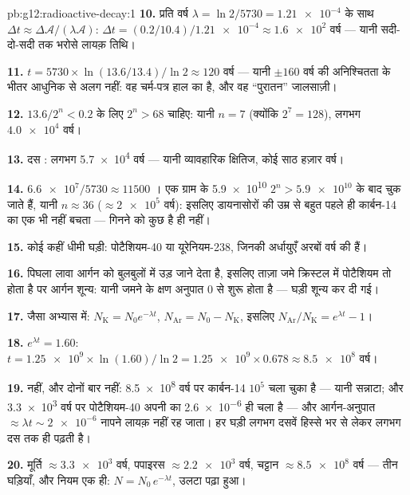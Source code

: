 \begin{solution}{pb:g12:radioactive-decay:1}
\textbf{10.} प्रति वर्ष $\lambda = \ln 2/5730 = \num{1.21e-4}$ के साथ $\Delta t \approx \Delta\mathcal A/(\lambda\mathcal A)$: $\Delta t = (0.2/10.4)/\num{1.21e-4} \approx \num{1.6e2}$ वर्ष --- यानी
सदी-दो-सदी तक भरोसे लायक़ तिथि।

\textbf{11.} $t = \num{5730} \times \ln(13.6/13.4)/\ln 2 \approx
120$ वर्ष --- यानी $\pm 160$ वर्ष की अनिश्चितता के भीतर आधुनिक
से अलग नहीं: वह चर्म-पत्र हाल का है, और वह ``पुरातन'' जालसाज़ी।

\textbf{12.} $13.6/2^n < 0.2$ के लिए $2^n > 68$ चाहिए: यानी $n = 7$  (क्योंकि
$2^7 = 128$), लगभग $\num{4.0e4}$ वर्ष।

\textbf{13.} दस : लगभग \num{5.7e4} वर्ष --- यानी व्यावहारिक क्षितिज, कोई
साठ हज़ार वर्ष।

\textbf{14.} $\num{6.6e7}/\num{5730} \approx \num{11500}$ । एक ग्राम के \num{5.9e10}  $2^n > \num{5.9e10}$ के
बाद चुक जाते हैं, यानी $n \approx 36$  ($\approx \num{2e5}$ वर्ष): इसलिए डायनासोरों की
उम्र से बहुत पहले ही कार्बन-14 का एक  भी नहीं बचता --- गिनने को
कुछ है ही नहीं।

\textbf{15.} कोई कहीं धीमी घड़ी: पोटैशियम-40 या यूरेनियम-238, जिनकी अर्धायुएँ
अरबों वर्ष की हैं।

\textbf{16.} पिघला लावा आर्गन को बुलबुलों में उड़ जाने देता है, इसलिए ताज़ा जमे
क्रिस्टल में पोटैशियम तो होता है पर आर्गन शून्य: यानी जमने के क्षण अनुपात
$0$ से शुरू होता है --- घड़ी शून्य कर दी गई।

\textbf{17.} जैसा अभ्यास में: $N_{\mathrm K} = N_0 e^{-\lambda t}$, $N_{\mathrm{Ar}} = N_0 - N_{\mathrm K}$, इसलिए $N_{\mathrm{Ar}}/N_{\mathrm K} = e^{\lambda t} - 1$।

\textbf{18.} $e^{\lambda t} = 1.60$: $t = \num{1.25e9} \times \ln(1.60)/\ln 2 = \num{1.25e9} \times 0.678
\approx \num{8.5e8}$ वर्ष।

\textbf{19.} नहीं, और दोनों बार नहीं: \num{8.5e8} वर्ष पर कार्बन-14 $10^5$
 चला चुका है --- यानी सन्नाटा; और \num{3.3e3} वर्ष पर पोटैशियम-40 अपनी
 का \num{2.6e-6} ही चला है --- और आर्गन-अनुपात $\approx \lambda t \sim \num{2e-6}$ नापने लायक़
नहीं रह जाता। हर घड़ी लगभग दसवें हिस्से भर  से लेकर लगभग दस
 तक ही पढ़ती है।

\textbf{20.} मूर्ति $\approx \num{3.3e3}$ वर्ष, पपाइरस $\approx \num{2.2e3}$ वर्ष, चट्टान $\approx \num{8.5e8}$ वर्ष ---
तीन घड़ियाँ, और नियम एक ही: $N = N_0\,e^{-\lambda t}$, उलटा पढ़ा हुआ।
\end{solution}
